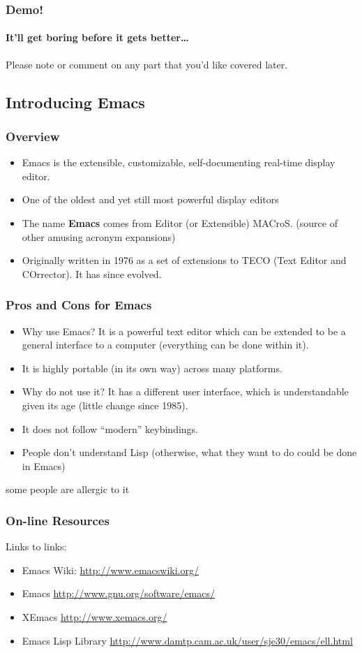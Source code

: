 \documentclass{beamer}
\begin{document}
\begin{frame} \frametitle{Demo!}
  \framesubtitle{It'll get boring before it gets better\ldots}
  \alert{Please note or comment on any part that you'd like covered later.}
\end{frame}

\subsection{Introducing Emacs}

\begin{frame} \frametitle{Overview}
  \begin{itemize}
  \item Emacs is the extensible, customizable, self-documenting
    real-time display editor.
  \item One of the oldest and yet still most powerful display editors
  \item The name \textbf{Emacs} comes from Editor (or Extensible)
    MACroS. (source of other amusing acronym expansions)
  \item Originally written in 1976 as a set of extensions to TECO
    (Text Editor and COrrector).  It has since evolved.
  \end{itemize}
\end{frame}

\begin{frame} \frametitle{Pros and Cons for Emacs}
  \begin{itemize}
  \item \alert{Why use Emacs?}  It is a powerful text editor which
    can be extended to be a general interface to a computer (everything can be done within it).
  \item It is highly portable (in its own way) across many platforms.
  \item \alert{Why do not use it?} It has a different user interface,
    which is understandable given its age (little change since 1985).
  \item It does not follow ``modern'' keybindings.
  \item People don't understand Lisp (otherwise, what they want to do
    could be done in Emacs)
  \end{itemize}
  \centerline{\alert{some people are allergic to it}}
\end{frame}

\begin{frame}
  \frametitle{On-line Resources}
  Links to links:
  \begin{itemize}
  \item Emacs Wiki: \url{http://www.emacswiki.org/}
  \item Emacs \url{http://www.gnu.org/software/emacs/}
  \item XEmacs \url{http://www.xemacs.org/}
  \item Emacs Lisp Library \url{http://www.damtp.cam.ac.uk/user/sje30/emacs/ell.html}
  \end{itemize}
\end{frame}
\end{document}
